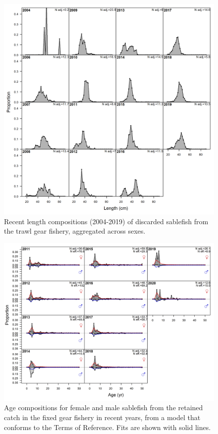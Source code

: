 \documentclass[11pt,
  english,
  a4paper,
]{article}
\begin{document}
\begin{figure}
\centering
\includegraphics[width=1\textwidth,height=1\textheight]{figs/comp_lendat_flt3mkt1.png}
\caption{Recent length compositions (2004-2019) of discarded sablefish from the trawl gear fishery, aggregated across sexes. \label{fig:discard_lencomps}}
\end{figure}

\tagmcend\tagstructend


\begin{figure}
\centering
\includegraphics[width=1\textwidth,height=1\textheight]{figs/tora_fleet1_agecomps.png}
\caption{Age compositions for female and male sablefish from the retained catch in the fixed gear fishery in recent years, from a model that conforms to the Terms of Reference. Fits are shown with solid lines. \label{fig:torafleet1agecomps}}
\end{figure}
\end{document}

